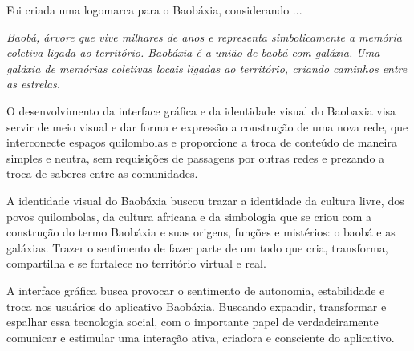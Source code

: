 Foi criada uma logomarca para o Baobáxia, considerando ...

\emph{Baobá, árvore que vive milhares de anos e representa simbolicamente
a memória coletiva ligada ao território. Baobáxia é a união de baobá com
galáxia. Uma galáxia de memórias coletivas locais ligadas ao território,
criando caminhos entre as estrelas.}

O desenvolvimento da interface gráfica e da identidade visual do Baobaxia
visa servir de meio visual e dar forma e expressão a construção de uma
nova rede, que interconecte espaços quilombolas e proporcione a troca de
conteúdo de maneira simples e neutra, sem requisições de passagens por
outras redes e prezando a troca de saberes entre as comunidades.

A identidade visual do Baobáxia buscou trazar a identidade da cultura livre,
dos povos quilombolas, da cultura africana e da simbologia que se criou com
a construção do termo Baobáxia e suas origens, funções e mistérios: o baobá
e as galáxias. Trazer o sentimento de fazer parte de um todo que cria,
transforma, compartilha e se fortalece no território virtual e real.

A interface gráfica busca provocar o sentimento de autonomia, estabilidade
e troca nos usuários do aplicativo Baobáxia. Buscando expandir, transformar
e espalhar essa tecnologia social, com o importante papel de verdadeiramente
comunicar e estimular uma interação ativa, criadora e consciente do
aplicativo. 



